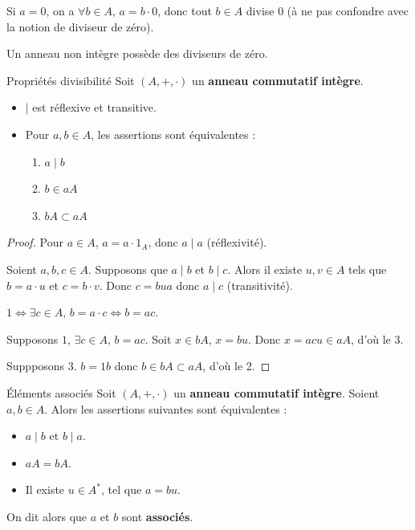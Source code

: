 \begin{remarque}
    Si $a = 0$, on a $\forall b \in A, \, a = b \cdot 0$, donc tout 
    $b \in A$ divise $0$ (à ne pas confondre avec la notion de diviseur de zéro).
\end{remarque}

\begin{remarque}
    Un anneau non intègre possède des diviseurs de zéro.
\end{remarque}

\begin{proposition}{Propriétés divisibilité}{}
    Soit $(A, +, \cdot)$ un \textbf{anneau commutatif intègre}. 

    \begin{itemize}
        \item $\mid$ est réflexive et transitive.
        \item Pour $a, b \in A$, les assertions sont équivalentes : 
        \begin{enumerate}
            \item $a \mid b$ 
            \item $b \in aA$
            \item $bA \subset aA$
        \end{enumerate}
    \end{itemize}
\end{proposition}

\begin{proof}
    Pour $a \in A$, $a = a \cdot 1_A$, donc $a \mid a$ (réflexivité).

    Soient $a, b, c \in A$. Supposons que $a \mid b$ et $b \mid c$.
    Alors il existe $u, v \in A$ tels que $b = a \cdot u$ et $c = b \cdot v$.
    Donc $c = bua$ donc $a \mid c$ (transitivité).

    \avspace $1 \Leftrightarrow \exists c \in A, \, b = a \cdot c \Leftrightarrow b = ac$.

    Supposons $1$, $\exists c \in A, \, b = ac$. Soit $x \in bA$, $x = bu$. Donc $x = acu \in aA$,
    d'où le 3.

    Suppposons 3. $b = 1b$ donc $b \in bA \subset aA$, d'où le 2.
\end{proof}

    
\begin{theoreme}{Éléments associés}{}
    Soit $(A, +, \cdot)$ un \textbf{anneau commutatif intègre}. 
    Soient $a, b \in A$. Alors les assertions suivantes sont équivalentes : 
    \begin{itemize}
        \item $a \mid b$ et $b \mid a$.
        \item $aA = bA$.
        \item Il existe $u \in A^*$, tel que $a = bu$.
    \end{itemize}
    On dit alors que $a$ et $b$ sont \textbf{associés}.
\end{theoreme}

